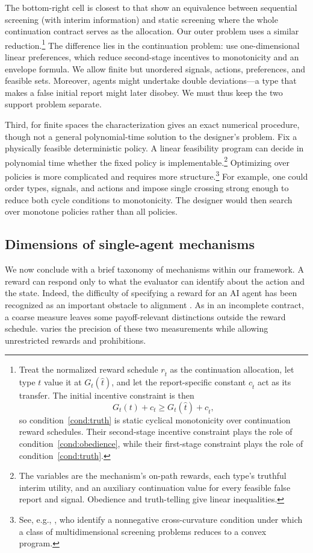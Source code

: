 \documentclass[12pt,reqno]{article}
\theoremstyle{definition} \newtheorem{example}{Example}
\theoremstyle{definition} \newtheorem{condition}{Condition}
\theoremstyle{definition} \newtheorem{corollary}{Corollary}
\theoremstyle{definition} \newtheorem{claim}{Claim}
\theoremstyle{definition} \newtheorem{definition}{Definition}
\theoremstyle{definition} \newtheorem{conjecture}{Conjecture}
\theoremstyle{definition} \newtheorem{Lemma}{Lemma}
\theoremstyle{definition} \newtheorem{lemma}{Lemma}
\theoremstyle{plain} \newtheorem{theorem}{Theorem}
\theoremstyle{definition} \newtheorem{assumption}{Assumption}
\theoremstyle{definition} \newtheorem*{assumptionnonumber}{Assumption}
\theoremstyle{definition} \newtheorem*{theoremNoNumber}{Proposition}
\theoremstyle{definition}\newtheorem{proposition}{Proposition}
\theoremstyle{definition} \newtheorem{observation}{Observation}
\theoremstyle{definition} \newtheorem*{definitionNoNumber}{Definition}
\theoremstyle{definition} \newtheorem{Definition}{Definition}
\theoremstyle{definition} \newtheorem*{DefinitionNoNumber}{Definition}
\theoremstyle{definition} \newtheorem*{fact}{Fact}
\theoremstyle{definition} \newtheorem*{property}{Property}
\theoremstyle{definition} \newtheorem{remark}{Remark}
\theoremstyle{definition}\newtheorem{romanexampleinner}{Example}
\begin{document}
The bottom-right cell is closest to \citet{krahmer2017sequential} that show an equivalence between sequential screening (with interim information) and static screening where the whole continuation contract serves as the allocation. Our outer problem uses a similar reduction.\footnote{ Treat the normalized reward schedule $r_{\hat t}$ as the continuation allocation, let type $t$ value it at $G_t(\hat t)$, and let the report-specific constant $c_{\hat t}$ act as its transfer. The initial incentive constraint is then
\[
G_t(t)+c_t\geq G_t(\hat t)+c_{\hat t},
\]
so condition~\eqref{cond:truth} is static cyclical monotonicity over continuation reward schedules. Their second-stage incentive constraint plays the role of condition~\eqref{cond:obedience}, while their first-stage constraint plays the role of condition~\eqref{cond:truth}.} 
The difference lies in the continuation problem: \cite{krahmer2017sequential} use one-dimensional linear preferences, which reduce second-stage incentives to monotonicity and an envelope formula. We allow finite but unordered signals, actions, preferences, and feasible sets. Moreover, agents might undertake double deviations---a type that makes a false initial report might later disobey. We must thus keep the two support problem separate. 

Third, for finite spaces the characterization gives an exact numerical procedure, though not a general polynomial-time solution to the designer's problem. Fix a physically feasible deterministic policy. A linear feasibility program can decide in polynomial time whether the fixed policy is implementable.\footnote{The variables are the mechanism's on-path rewards, each type's truthful interim utility, and an auxiliary continuation value for every feasible false report and signal. Obedience and truth-telling give linear inequalities.} Optimizing over policies is more complicated and requires more structure.\footnote{See, e.g., \citet{figalli2011screening}, who identify a nonnegative cross-curvature condition under which a class of multidimensional screening problems reduces to a convex program.} For example, one could order types, signals, and actions and impose single crossing strong enough to reduce both cycle conditions to monotonicity. The designer would then search over monotone policies rather than all policies. 

\subsection{Dimensions of single-agent mechanisms}\label{sec:classes} We now conclude with a brief taxonomy of mechanisms within our framework. A reward can respond only to what the evaluator can identify about the action and the state. Indeed, the difficulty of specifying a reward for an AI agent has been recognized as an important obstacle to alignment \citep{hadfield2019incomplete,hadfield-menellthesis}. As in an incomplete contract, a coarse measure leaves some payoff-relevant distinctions outside the reward schedule.  varies the precision of these two measurements while allowing unrestricted rewards and prohibitions.
\end{document}
